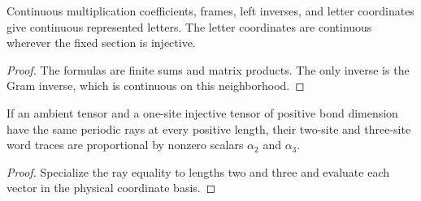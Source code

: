 \begin{lemma}
    \label{thm:spt_continuous_left_ideal_letters}
    \leanok
    Continuous multiplication coefficients, frames, left inverses,
    and letter coordinates give continuous represented letters.
    The letter coordinates are continuous wherever the fixed section
    is injective.
\end{lemma}
\begin{proof}\leanok
    The formulas are finite sums and matrix products. The only inverse
    is the Gram inverse, which is continuous on this neighborhood.
\end{proof}

\begin{lemma}
    \label{thm:spt_positive_ray_finite_traces}
    \leanok
    If an ambient tensor and a one-site injective tensor of positive bond
    dimension have the same periodic rays at every positive length,
    their two-site and three-site word traces are proportional by
    nonzero scalars $\alpha_2$ and $\alpha_3$.
\end{lemma}
\begin{proof}\leanok
    Specialize the ray equality to lengths two and three and evaluate
    each vector in the physical coordinate basis.
\end{proof}

